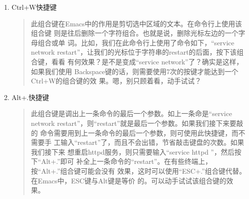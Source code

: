 \begin{enumerate}[itemsep=0pt,parsep=0pt]
\item Ctrl+W快捷键
  \begin{quote}
    此组合键在Emacs中的作用是剪切选中区域的文本。在命令行上使用该组合键
    则是往后删除一个字符组合。也就是说，删除光标左边的一个字母组合或单
    词。比如，我们在此命令行上使用了命令如下，“service network
    restart”，让我们的光标位于字符串的restart的后面，按下该组合键，看看
    有何效果？是不是变成“service network”了？确实是这样，如果我们使用
    Backspace键的话，则需要使用7次的按键才能达到一个Ctrl+W的组合键的效
    果。嗯，别只顾着看，动手试试？
  \end{quote}

\item Alt+.快捷键
  \begin{quote}
    此组合键是调出上一条命令的最后一个参数。如上一条命是“service
    network restart”，则“restart”就是最后一个参数。如果我们接下来要敲的
    命令需要用到上一条命令的最后一个参数，则可使用此快捷键，而不需要手
    工输入“restart”了，而且不会出错，节省敲击键盘的次数。如果我们接下来
    想重启httpd服务，则只需要输入“service httpd ”，然后按下“Alt+.”即可
    补全上一条命令的“restart”。在有些终端上，按“Alt+.”组合键可能会没有
    效果，这时可以使用“ESC+.”组合键代替。在Emacs中，ESC键与Alt键是等价
    的。可以动手试试该组合键的效果。
  \end{quote}

\end{enumerate}
